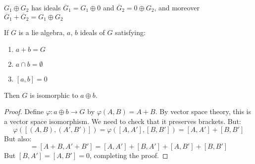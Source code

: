     $G_{1}\oplus{G}_{2}$ has ideals $\overline{G}_{1}=G_{1}\oplus{0}$ and
    $\overline{G}_{2}=0\oplus{G}_{2}$, and moreover
    $\overline{G}_{1}+\overline{G}_{2}=G_{1}\oplus{G}_{2}$
    \begin{theorem}
        If $G$ is a lie algebra, $a$, $b$ ideals of $G$ satisfying:
        \begin{enumerate}
            \item $a+b=G$
            \item $a\cap{b}=\emptyset$
            \item $[a,b]=0$
        \end{enumerate}
        Then $G$ is isomorphic to $a\oplus{b}$.
    \end{theorem}
    \begin{proof}
        Define $\varphi:a\oplus{b}\rightarrow{G}$ by
        $\varphi(A,B)=A+B$. By vector space theory, this is a vector
        space isomorphism. We need to check that it preserves brackets.
        But:
        \begin{equation}
            \varphi([(A,B),(A',B')])=\varphi([A,A'],[B,B'])
            =[A,A']+[B,B']
        \end{equation}
        But also:
        \begin{equation}
            [\varphi(A,B),\varphi(A',B')]=[A+B,A'+B']
            =[A,A']+[B,A']+[A,B']+[B,B']
        \end{equation}
        But $[B,A']=[A,B']=0$, completing the proof.
    \end{proof}
